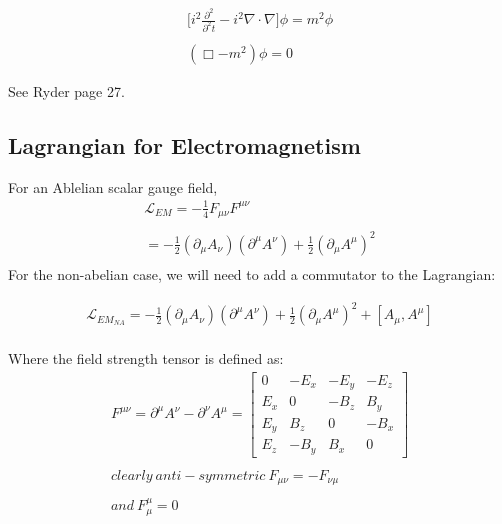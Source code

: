 \documentclass[aps,secnumarabic,nobalancelastpage,amsmath,amssymb,
nofootinbib]{revtex4}
\newcommand{\Lagr}{\mathcal{L}}
\begin{document}
\begin{equation}
\begin{split}
\bigg[i^2\frac{\partial^2}{\partial^2 t}-i^2 \nabla\cdot\nabla\bigg]\phi=m^2\phi\\
\\ (\Box - m^2)\phi=0
\, \label{eq:19}
\end{split}
\end{equation}

See Ryder page 27.


\subsection{Lagrangian for Electromagnetism}
\noindent For an Ablelian scalar gauge field,
\begin{equation}
\begin{split}
\Lagr_{EM} = - \frac{1}{4} F_{\mu\nu}F^{\mu\nu}\\
\\
= -\frac{1}{2} (\partial_\mu A_\nu)(\partial^\mu A^\nu) + \frac{1}{2} (\partial_\mu A^\mu)^2\\
\, \label{eq:20}
\end{split}
\end{equation}
\noindent For the non-abelian case, we will need to add a commutator to the Lagrangian: 

\begin{equation}
\begin{split}
\Lagr_{EM_{NA}}= -\frac{1}{2} (\partial_\mu A_\nu)(\partial^\mu A^\nu) + \frac{1}{2} (\partial_\mu A^\mu)^2 + [A_\mu,A^\mu]\\
\, \label{eq:21}
\end{split}
\end{equation}

\noindent Where the field strength tensor is defined as: \vspace{3mm}
 \begin{equation}
\begin{split}
 F^{\mu\nu}=\partial^\mu A^\nu - \partial^\nu A^\mu =\begin{bmatrix}
    0       & -E_x & -E_y & -E_z  \\
    E_x       & 0 & -B_z & B_y  \\
    E_y       & B_z & 0 & -B_x \\
    E_z      & -B_y & B_x & 0
\end{bmatrix}\\\\
clearly \ anti-symmetric \ F_{\mu\nu}=-F_{\nu\mu }\\\\
and \ F_\mu^\mu=0
\, \label{eq:22}
\end{split}
\end{equation}
 
\end{document}
